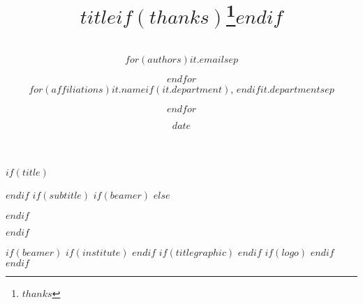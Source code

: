 $if(title)$
\title{$title$$if(thanks)$\thanks{$thanks$}$endif$}
$endif$
$if(subtitle)$
$if(beamer)$
$else$
\usepackage{etoolbox}
\makeatletter
\providecommand{\subtitle}[1]{%
  \apptocmd{\@title}{\par {\large #1 \par}}{}{}
}
\makeatother
$endif$
\subtitle{$subtitle$}
$endif$
\author{\\$for(authors)$$it.email$$sep$ \and $endfor$\\$for(affiliations)$$it.name$$if(it.department)$, $endif$$it.department$$sep$ \and $endfor$}
\date{$date$}
$if(beamer)$
$if(institute)$
$endif$
$if(titlegraphic)$
$endif$
$if(logo)$
$endif$
$endif$
